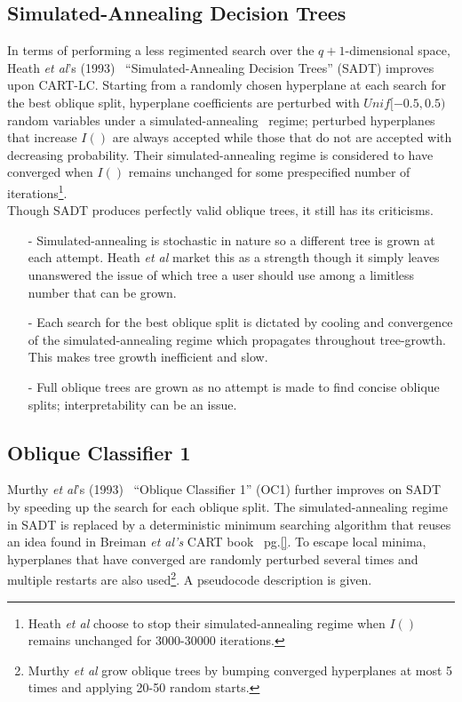 \subsection{Simulated-Annealing Decision Trees}
\label{SimulatedAnnealingDecisionTrees}
In terms of performing a less regimented search over the $q+1$-dimensional space, Heath \emph{et al}'s (1993)~\cite{heath93induction} ``Simulated-Annealing Decision Trees'' (SADT) improves upon CART-LC. Starting from a randomly chosen hyperplane at each search for the best oblique split, hyperplane coefficients are perturbed with $Unif[-0.5,0.5)$ random variables under a simulated-annealing~\cite{kirkpatrick83optimization}\cite{cerny:1985:thermodynamical} regime; perturbed hyperplanes that increase $I()$ are always accepted while those that do not are accepted with decreasing probability. Their simulated-annealing regime is considered to have converged when $I()$ remains unchanged for some prespecified number of iterations\footnote{Heath \emph{et al} choose to stop their simulated-annealing regime when $I()$ remains unchanged for 3000-30000 iterations.}. \\

Though SADT produces perfectly valid oblique trees, it still has its criticisms. 
\begin{itemize}
\item[-] Simulated-annealing is stochastic in nature so a different tree is grown at each attempt. Heath \emph{et al} market this as a strength though it simply leaves unanswered the issue of which tree a user should use among a limitless number that can be grown.
\item[-] Each search for the best oblique split is dictated by cooling and convergence of the simulated-annealing regime which propagates throughout tree-growth. This makes tree growth inefficient and slow. 
\item[-] Full oblique trees are grown as no attempt is made to find concise oblique splits; interpretability can be an issue.
\end{itemize}

\subsection{Oblique Classifier 1}
\label{ObliqueClassifier1}
Murthy \emph{et al}'s (1993)~\cite{murthy93oc} ``Oblique Classifier 1'' (OC1) further improves on SADT by speeding up the search for each oblique split. The simulated-annealing regime in SADT is replaced by a deterministic minimum searching algorithm that reuses an idea found in Breiman \emph{et al's} CART book~\cite{cart84-2} pg.\ref{}. To escape local minima, hyperplanes that have converged are randomly perturbed several times and multiple restarts are also used\footnote{Murthy \emph{et al} grow oblique trees by bumping converged hyperplanes at most 5 times and applying 20-50 random starts.}. A pseudocode description is given.\\ 

